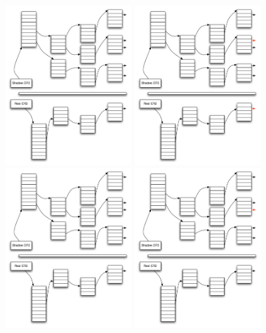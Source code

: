 \begin{frame}
\begin{overlayarea}{10cm}{10cm}
 {\includegraphics[height=6cm]{figures/shadow_page_table_5}}
 {\includegraphics[height=6cm]{figures/shadow_page_table_6}}
 {\includegraphics[height=6cm]{figures/shadow_page_table_7}}
 {\includegraphics[height=6cm]{figures/shadow_page_table_8}}

\end{overlayarea}
\end{frame}

